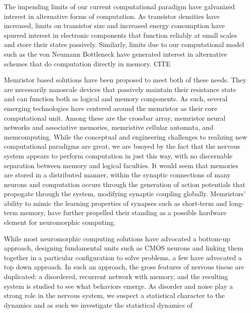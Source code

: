 \documentclass[aps,prl,preprint,groupedaddress]{revtex4-1}
\begin{document}
The impending limits of our current computational paradigm have galvanized
interest in alternative forms of computation. As transistor densities have
increased, limits on transistor size and increased energy consumption have
spurred interest in electronic components that function reliably at small
scales and store their states passively.  Similarly, limits due to our
computational model such as the von Neumann Bottleneck have generated
interest in alternative schemes that do computation directly in memory.
CITE

Memristor based solutions have been proposed to meet both of these needs.
They are
necessarily nanoscale devices that passively maintain their resistance
state and can function both as logical and memory components.  As such,
several emerging technologies have centered around the memristor as
their core computational unit.  Among these are the crossbar array,
memristor neural networks and associative memories, memristive cellular
automata, and memcomputing.  While the conceptual and engineering
challenges to realizing new computational paradigms are great, we are
buoyed by the fact that the nervous system appears to perform computation
in just this way, with no discernable separation between memory and
logical faculties.  It would seem that memories are stored in a
distributed manner, within the synaptic connections of many neurons
and computation occurs through the generation of action potentials that
propogate through the system, modifying synaptic coupling globally.
Memristors' ability to mimic the learning properties of synapses such as
short-term and long-term memory, have further propelled their standing as
a possible hardware element for neuromorphic computing.

While most neuromorphic computing solutions have advocated a bottom-up
approach, designing fundamental units such as CMOS neurons
and linking them together in a
particular configuration to solve problems, a few have advocated a top
down approach.  In such an approach, the gross features of nervous
tissue are duplicated: a disordered, recurrent network with memory, and
the resulting system is studied to see what behaviors emerge.  As disorder
and noise play a strong role in the nervous system, we suspect a statistical
character to the dynamics and as such we investigate the statistical
dynamics of 



\end{document}
